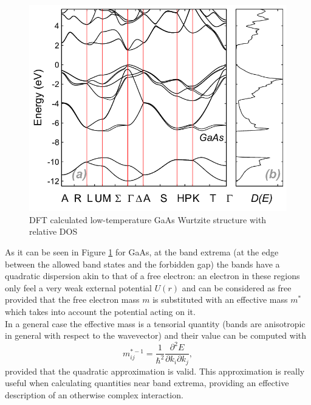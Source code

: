 \documentclass[12pt, a4paper]{report}
\numberwithin{equation}{section}
\begin{document}
\begin{figure}[H]
    \centering
    \includegraphics[scale=0.4]{a-Calculated-low-temperature-band-structure-for-GaAs-in-WZ-phase-b-Calculated-DOS.png}
    \caption{DFT calculated low-temperature GaAs Wurtzite structure with relative DOS \cite{GaAs_wurtzite_structure}}
    \label{fig:GaAs_Wurtzite_structure}
\end{figure}
As it can be seen in Figure \ref{fig:GaAs_Wurtzite_structure} for GaAs, at the band extrema (at the edge between the allowed band states 
and the forbidden gap) the bands have a quadratic dispersion akin to that of a free electron: an electron in these regions only feel a 
very weak external potential $U(r)$ and can be considered as free provided that the free electron mass $m$ is substituted with an effective mass 
$m^*$ which takes into account the potential acting on it.\\
In a general case the effective mass is a tensorial quantity (bands are anisotropic in general with respect to the wavevector) and 
their value can be computed with
\begin{equation}
    m^{*-1}_{ij}=\frac{1}{\hbar^2}\frac{\partial^2 E}{\partial k_i \partial k_j},
    \label{eq_effective_mass}
\end{equation}
provided that the quadratic approximation is valid. This approximation is really useful when calculating quantities near band extrema, 
providing an effective description of an otherwise complex interaction.
\end{document}
